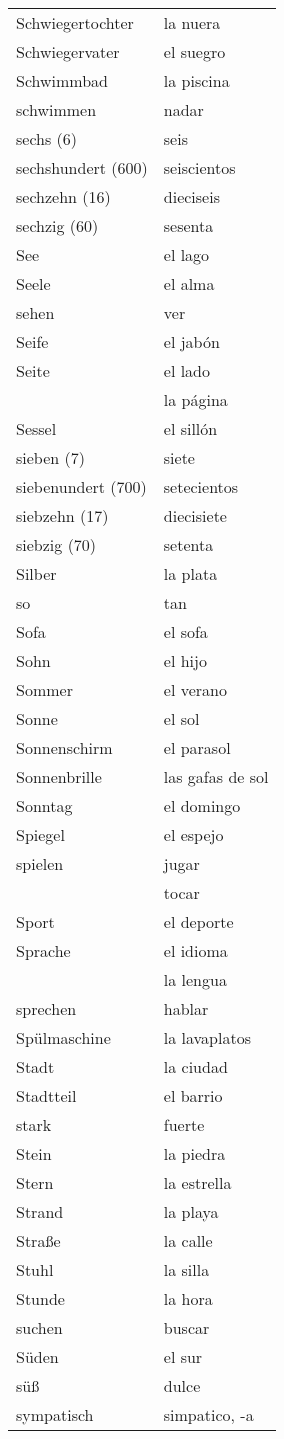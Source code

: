 \begin{longtable}{p{} p{}}
Schwiegertochter & la nuera\\
Schwiegervater & el suegro\\
Schwimmbad & la piscina\\
schwimmen & nadar\\
sechs (6) & seis\\
sechshundert (600) & seiscientos\\
sechzehn (16) & dieciseis\\
sechzig (60) & sesenta\\
See & el lago\\
Seele & el alma\\
sehen & ver\\
Seife & el jabón\\
Seite & el lado\\
~ & la página\\
Sessel & el sillón\\
sieben (7) & siete\\
siebenundert (700) & setecientos\\
siebzehn (17) & diecisiete\\
siebzig (70) & setenta\\
Silber & la plata\\
so & tan\\
Sofa & el sofa\\
Sohn & el hijo\\
Sommer & el verano\\
Sonne & el sol\\
Sonnenschirm & el parasol\\
Sonnenbrille & las gafas de sol\\
Sonntag & el domingo\\
Spiegel & el espejo\\
spielen & jugar\\
~ & tocar\\
Sport & el deporte\\
Sprache & el idioma\\
~ & la lengua\\
sprechen & hablar\\
Spülmaschine & la lavaplatos\\
Stadt & la ciudad\\
Stadtteil & el barrio\\
stark & fuerte\\
Stein & la piedra\\
Stern & la estrella\\
Strand & la playa\\
Straße & la calle\\
Stuhl & la silla\\
Stunde & la hora\\
suchen & buscar\\
Süden & el sur\\
süß & dulce\\
sympatisch & simpatico, -a\\
\end{longtable}
